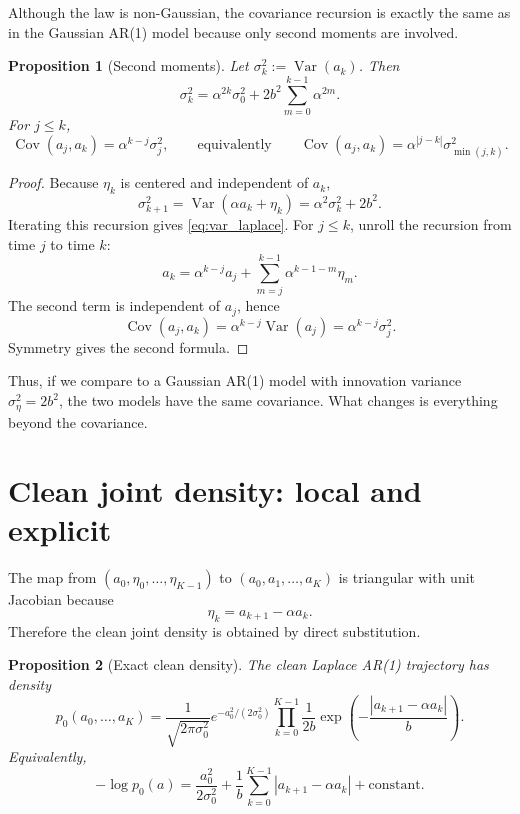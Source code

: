 \documentclass[11pt]{article}
\newtheorem{proposition}{Proposition}[section]
\newcommand{\Var}{\operatorname{Var}}
\newcommand{\Cov}{\operatorname{Cov}}
\newcommand{\abs}[1]{\left| #1 \right|}
\begin{document}
Although the law is non-Gaussian, the covariance recursion is exactly the same as in the Gaussian AR(1) model because only second moments are involved.
\begin{proposition}[Second moments]\label{prop:second_moments}
Let $\sigma_k^2:=\Var(a_k)$. Then
\begin{equation}\label{eq:var_laplace}
\sigma_k^2=\alpha^{2k}\sigma_0^2+2b^2\sum_{m=0}^{k-1}\alpha^{2m}.
\end{equation}
For $j\le k$,
\begin{equation}\label{eq:cov_laplace}
\Cov(a_j,a_k)=\alpha^{k-j}\sigma_j^2,
\qquad
\text{equivalently}
\qquad
\Cov(a_j,a_k)=\alpha^{\abs{j-k}}\sigma_{\min(j,k)}^2.
\end{equation}
\end{proposition}

\begin{proof}
Because $\eta_k$ is centered and independent of $a_k$,
\[
\sigma_{k+1}^2=\Var(\alpha a_k+\eta_k)=\alpha^2\sigma_k^2+2b^2.
\]
Iterating this recursion gives \eqref{eq:var_laplace}. For $j\le k$, unroll the recursion from time $j$ to time $k$:
\[
 a_k=\alpha^{k-j}a_j+\sum_{m=j}^{k-1}\alpha^{k-1-m}\eta_m.
\]
The second term is independent of $a_j$, hence
\[
\Cov(a_j,a_k)=\alpha^{k-j}\Var(a_j)=\alpha^{k-j}\sigma_j^2.
\]
Symmetry gives the second formula.
\end{proof}

Thus, if we compare to a Gaussian AR(1) model with innovation variance $\sigma_\eta^2=2b^2$, the two models have the same covariance. What changes is everything beyond the covariance.

\section{Clean joint density: local and explicit}
The map from $(a_0,\eta_0,\dots,\eta_{K-1})$ to $(a_0,a_1,\dots,a_K)$ is triangular with unit Jacobian because
\[
\eta_k=a_{k+1}-\alpha a_k.
\]
Therefore the clean joint density is obtained by direct substitution.
\begin{proposition}[Exact clean density]\label{prop:clean_density}
The clean Laplace AR(1) trajectory has density
\begin{equation}\label{eq:clean_density}
 p_0(a_0,\dots,a_K)
 =
 \frac{1}{\sqrt{2\pi\sigma_0^2}}e^{-a_0^2/(2\sigma_0^2)}
 \prod_{k=0}^{K-1}\frac{1}{2b}
 \exp\!\left(-\frac{\abs{a_{k+1}-\alpha a_k}}{b}\right).
\end{equation}
Equivalently,
\begin{equation}\label{eq:clean_energy}
-\log p_0(a)
=
\frac{a_0^2}{2\sigma_0^2}
+
\frac{1}{b}\sum_{k=0}^{K-1}\abs{a_{k+1}-\alpha a_k}
+\text{constant}.
\end{equation}
\end{proposition}
\end{document}
